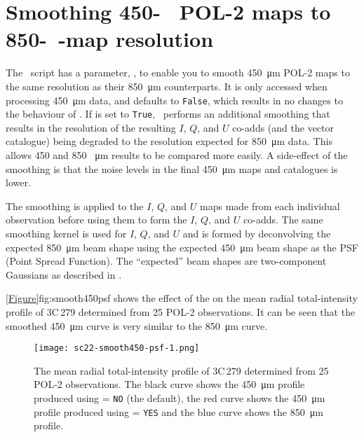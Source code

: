 \section{Smoothing 450-\SI{}{\textbf{\micro\metre}}
POL-2 maps to 850-\SI{}{\textbf{\micro\metre}}-map resolution}

The \poltwomap\ script has a parameter, , to enable you to smooth
\SI{450}{\micro\metre} POL-2 maps to the same resolution as their \SI{850}{\micro\metre}
counterparts. It is only accessed when processing \SI{450}{\micro\metre} data, and defaults
to \texttt{False}, which results in no changes to the behaviour of \poltwomap. If
 is set to \texttt{True}, \poltwomap\ performs an additional smoothing
that results in the resolution of the resulting
$I$, $Q$, and $U$ co-adds (and the vector catalogue) being degraded to the resolution expected
for \SI{850}{\micro\metre} data. This allows 450 and 850 \SI{}{\micro\metre} results to be
compared more easily. A side-effect of the smoothing is that the noise
levels in the final \SI{450}{\micro\metre} maps and catalogues is lower.

The smoothing is applied to the $I$, $Q$, and $U$ maps made from each
individual observation before using them to form the $I$, $Q$, and $U$ co-adds. The
same smoothing kernel is used for $I$, $Q$, and $U$ and is formed by deconvolving the
expected \SI{850}{\micro\metre} beam shape using the expected
\SI{450}{\micro\metre} beam shape as the PSF (Point Spread Function). The
``expected'' beam shapes are two-component Gaussians as described in
\cite{dempsey12}.

\cref{Figure}{fig:smooth450psf}{} shows the effect of the  on
the mean radial total-intensity profile of 3C\,279 determined from 25 POL-2
observations. It can be seen that the smoothed \SI{450}{\micro\metre} curve is
very similar to the \SI{850}{\micro\metre} curve.

\begin{figure}[ht!]
\begin{center}
\texttt{[image: sc22-smooth450-psf-1.png]}
\caption [PSF plot showing the effect of the \poltwomap\  parameter.]{
  The mean radial total-intensity profile of 3C\,279 determined from 25 POL-2 observations.
  The black curve shows the \SI{450}{\micro\metre} profile produced using
   = \texttt{NO} (the default), the red curve shows the \SI{450}{\micro\metre}
  profile produced using  = \texttt{YES} and the blue curve shows the
  \SI{850}{\micro\metre} profile.
\label{fig:smooth450psf}
}
\end{center}
\end{figure}

